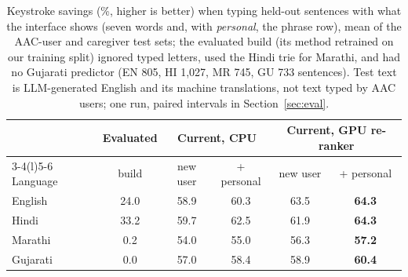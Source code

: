 \begin{table}[t]
\centering\footnotesize
\setlength{\tabcolsep}{3.2pt}
\begin{tabular}{@{}lccccc@{}}
\toprule
 & Evaluated & \multicolumn{2}{c}{Current, CPU} & \multicolumn{2}{c}{Current, GPU re-ranker} \\
\cmidrule(lr){3-4}\cmidrule(l){5-6}
Language & build & new user & + personal & new user & + personal \\
\midrule
English  & 24.0 & 58.9 & 60.3 & 63.5 & \textbf{64.3} \\
Hindi    & 33.2 & 59.7 & 62.5 & 61.9 & \textbf{64.3} \\
Marathi  & 0.2 & 54.0 & 55.0 & 56.3 & \textbf{57.2} \\
Gujarati & 0.0 & 57.0 & 58.4 & 58.9 & \textbf{60.4} \\
\bottomrule
\end{tabular}
\caption{Keystroke savings (\%, higher is better) when typing held-out sentences with what the interface shows (seven words and, with \emph{personal}, the phrase row), mean of the AAC-user and caregiver test sets; the evaluated build (its method retrained on our training split) ignored typed letters, used the Hindi trie for Marathi, and had no Gujarati predictor (EN 805, HI 1,027, MR 745, GU 733 sentences). Test text is LLM-generated English and its machine translations, not text typed by AAC users; one run, paired intervals in Section~\ref{sec:eval}.}
\label{tab:ksr}
\end{table}
